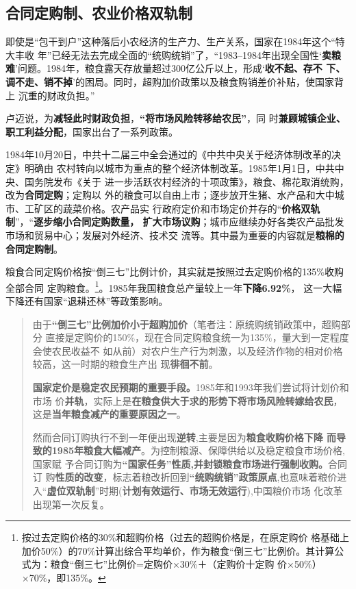 \subsection{合同定购制、农业价格双轨制}
\label{sec:nongshuanggui}

即使是“包干到户”这种落后小农经济的生产力、生产关系，国家在1984年这个“特大丰收
年”已经无法去完成全面的“统购统销”了，“1983--1984年出现全国性‘\textbf{卖粮
  难}’问题。1984年，粮食露天存放量超过300亿公斤以上，形成‘\textbf{收不起、存不
  下、调不走、销不掉}’的困局。同时，超购加价政策以及粮食购销差价补贴，使国家背上
沉重的财政负担。”\cite{liangshi40}

卢迈说，为\textbf{减轻此时财政负担}，\textbf{“将市场风险转移给农民”}，同
时\textbf{兼顾城镇企业、职工利益分配}，国家出台了一系列政策。

1984年10月20日，中共十二届三中全会通过的《中共中央关于经济体制改革的决定》明确由
农村转向以城市为重点的整个经济体制改革。1985年1月1日，中共中央、国务院发布《关于
进一步活跃农村经济的十项政策》，粮食、棉花取消统购，改为\textbf{合同定购}；定购以
外的粮食可以自由上市；逐步放开生猪、水产品和大中城市、工矿区的蔬菜价格。农产品实
行政府定价和市场定价并存的“\textbf{价格双轨制}”，“\textbf{逐步缩小合同定购数量，
  扩大市场议购}；城市应继续办好各类农产品批发市场和贸易中心；发展对外经济、技术交
流等。其中最为重要的内容就是\textbf{粮棉的合同定购制}。

粮食合同定购价格按“倒三七”比例计价，其实就是按照过去定购价格的135\%收购全部合同
定购粮食。\footnote{按过去定购价格的30\%和超购价格（过去的超购价格是，在原定购价
  格基础上加价50\%）的70\%计算出综合平均单价，作为粮食“倒三七”比例价。其计算公
  式为：粮食“倒三七”比例价=定购价×30\%＋（定购价十定购
  价×50\%）×70\%，即135\%。}。1985年我国粮食总产量较上一年\textbf{下降6.92\%}，
这一大幅下降还有国家“退耕还林”等政策影响。

\begin{quotation}
  由于\textbf{“倒三七”比例加价小于超购加价}（笔者注：原统购统销政策中，超购部分
  直接是定购价的150\%，现在合同定购粮食统一为135\%，量大到一定程度会使农民收益不
  如从前）对农户生产行为刺激，以及经济作物的相对价格较高，这一时期的粮食生产出
  现\textbf{徘徊不前}。\cite{shuangguizhi}

  \textbf{国家定价是稳定农民预期的重要手段。}1985年和1993年我们尝试将计划价和市场
  价\textbf{并轨}，实际上是\textbf{在粮食供大于求的形势下将市场风险转嫁给农民}，
  这是\textbf{当年粮食减产的重要原因之一}。\cite{lumaisg}

  然而合同订购执行不到一年便出现\textbf{逆转},主要是因为\textbf{粮食收购价格下降
    而导致的1985年粮食大幅减产}。为控制粮源、保障供给以及稳定粮食市场价格,国家赋
  予合同订购为\textbf{“国家任务”性质,并封锁粮食市场进行强制收购。}合同订
  购\textbf{性质的改变}，标志着粮改折回到\textbf{“统购统销”政策原点},也意味着粮价进
  入“\textbf{虚位双轨制}”时期(\textbf{计划有效运行、市场无效运行}),中国粮价市场
  化改革出现第一次反复。\cite{liangshi40}
\end{quotation}

